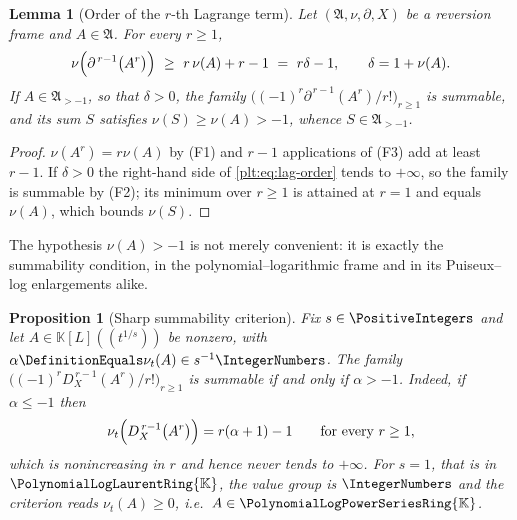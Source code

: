 \documentclass[11pt,oneside]{article}
\theoremstyle{plain}
\newtheorem{proposition}[theorem]{Proposition}
\newtheorem{lemma}[theorem]{Lemma}
\theoremstyle{definition}
\theoremstyle{remark}
\newcommand{\K}{\mathbb{K}}
\newcommand{\PLpow}{\PolynomialLogPowerSeriesRing{\K}}   %
\newcommand{\PLlau}{\PolynomialLogLaurentRing{\K}}       %
\newcommand{\ordt}{\nu_{t}}                              %
\newcommand{\DX}{D_{X}}                                  %
\begin{document}
\begin{lemma}[Order of the \(r\)-th Lagrange term]
\label{plt:lem:lag-order}
Let \((\mathfrak A,\nu,\partial,X)\) be a reversion frame and
\(A\in\mathfrak A\).  For every \(r\ge1\),
\begin{equation}
\label{plt:eq:lag-order}
  \nu\Bigl(\partial^{\,r-1}\bigl(A^r\bigr)\Bigr)\ \ge\ r\,\nu(A)+r-1
  \ =\ r\delta-1,
  \qquad \delta=1+\nu(A).
\end{equation}
If \(A\in\mathfrak A_{>-1}\), so that \(\delta>0\), the family
\(\bigl((-1)^r\partial^{\,r-1}(A^r)/r!\bigr)_{r\ge1}\) is summable, and its sum
\(S\) satisfies \(\nu(S)\ge\nu(A)>-1\), whence \(S\in\mathfrak A_{>-1}\).
\end{lemma}

\begin{proof}
\(\nu(A^r)=r\nu(A)\) by (F1) and \(r-1\) applications of (F3) add at least
\(r-1\).  If \(\delta>0\) the right-hand side of \cref{plt:eq:lag-order} tends
to \(+\infty\), so the family is summable by (F2); its minimum over \(r\ge1\) is
attained at \(r=1\) and equals \(\nu(A)\), which bounds \(\nu(S)\).
\end{proof}

The hypothesis \(\nu(A)>-1\) is not merely convenient: it is exactly the
summability condition, in the polynomial--logarithmic frame and in its
Puiseux--log enlargements alike.

\begin{proposition}[Sharp summability criterion]
\label{plt:prop:lag-summability-sharp}
Fix \(s\in\PositiveIntegers\) and let \(A\in\K[L]((t^{1/s}))\) be nonzero, with
\(\alpha\DefinitionEquals\ordt(A)\in s^{-1}\IntegerNumbers\).  The family
\(\bigl((-1)^r\DX^{\,r-1}(A^r)/r!\bigr)_{r\ge1}\) is summable if and only if
\(\alpha>-1\).  Indeed, if \(\alpha\le-1\) then
\begin{equation}
\label{plt:eq:lag-order-exact}
  \ordt\Bigl(\DX^{\,r-1}\bigl(A^r\bigr)\Bigr)=r(\alpha+1)-1
  \qquad\text{for every }r\ge1,
\end{equation}
which is nonincreasing in \(r\) and hence never tends to \(+\infty\).  For
\(s=1\), that is in \(\PLlau\), the value group is \(\IntegerNumbers\) and the
criterion reads \(\ordt(A)\ge0\), i.e.\ \(A\in\PLpow\).
\end{proposition}
\end{document}
